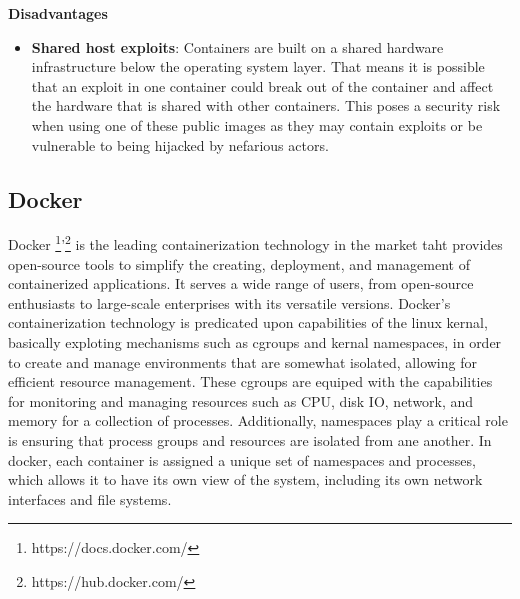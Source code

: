 \begin{enumerate}
          \textbf{Disadvantages}
          \begin{itemize}
              \item \textbf{Shared host exploits}: Containers are built on a shared hardware infrastructure below the operating system layer. That means it is possible that an exploit in one container could break out of the container and affect the hardware that is shared with other containers. This poses a security risk when using one of these public images as they may contain exploits or be vulnerable to being hijacked by nefarious actors.
          \end{itemize}
\end{enumerate}
\subsection{Docker}
Docker \footnote{https://docs.docker.com/}'\footnote{https://hub.docker.com/} \cite{Intro_Docker} is the leading containerization technology in the market taht provides open-source tools to simplify the creating, deployment, and management of containerized applications. It serves a wide range of users, from open-source enthusiasts to large-scale enterprises with its versatile versions. 
\newline
Docker's containerization technology is predicated upon capabilities of the linux kernal, basically exploting mechanisms such as \ac{cgroups} and kernal namespaces, in order to create and manage environments that are somewhat isolated, allowing for efficient resource management. 
These \ac{cgroups} are equiped with the capabilities for monitoring and managing resources such as CPU, disk IO, network, and memory for a collection of processes. 
Additionally, namespaces play a critical role is ensuring that process groups and resources are isolated from ane another. 
In docker, each container is assigned a unique set of namespaces and processes, which allows it to have its own view of the system, including its own network interfaces and file systems.


